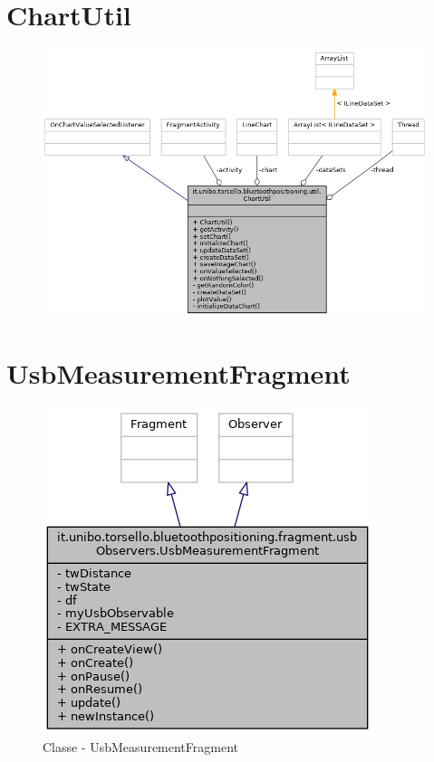 \section{ChartUtil}
\begin{figure}[ph]
	\centering
	\includegraphics[width=1.2\linewidth]{img/uml/class/classit_1_1unibo_1_1torsello_1_1bluetoothpositioning_1_1util_1_1ChartUtil__coll__graph.png}
	\caption{}
\end{figure}

\newpage
\section{UsbMeasurementFragment}
\begin{figure}[ph]
	\centering
	\includegraphics[width=0.5\linewidth]{img/uml/class/classit_1_1unibo_1_1torsello_1_1bluetoothpositioning_1_1fragment_1_1usbObservers_1_1UsbMeasurementFragment__inherit__graph.png}
	\caption{Classe - UsbMeasurementFragment}
\end{figure}

